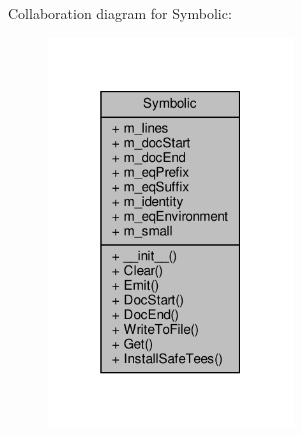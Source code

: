Collaboration diagram for Symbolic\+:
\nopagebreak
\begin{figure}[H]
\begin{center}
\leavevmode
\includegraphics[width=184pt]{classSignalIntegrity_1_1SystemDescriptions_1_1Symbolic_1_1Symbolic__coll__graph}
\end{center}
\end{figure}
